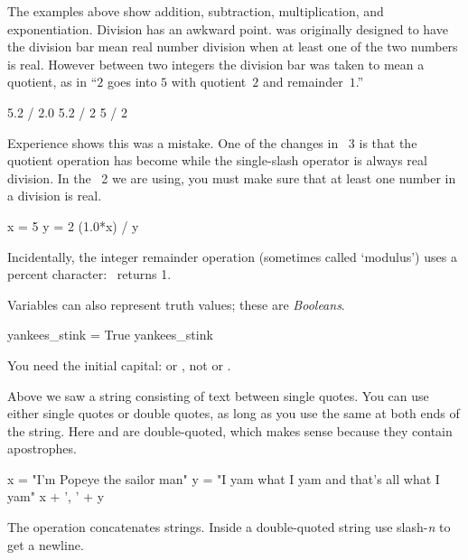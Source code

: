 The examples above show addition, subtraction, multiplication, 
and exponentiation. 
Division has an awkward point.
\python{} was originally designed to have the division bar
\inlinecode{/} mean real number division 
when at least one of the two numbers is real.
However between two integers the division bar was taken to mean 
a quotient, as in ``$2$ goes into $5$ with quotient~$2$ and remainder~$1$.''
\begin{pythonoutput}
5.2 / 2.0
5.2 / 2
5 / 2
\end{pythonoutput}
Experience shows this was a mistake. 
One of the changes in \python~3
is that the quotient operation has become \inlinecode{//}
while the single-slash operator is always real division.
In the \python~2 we are using, you must make sure that at least one
number in a division is real.
\begin{pythonoutput}
x = 5
y = 2
(1.0*x) / y
\end{pythonoutput}
\noindent Incidentally, 
the integer remainder operation (sometimes called `modulus')  
uses a percent character:~ returns 1.

Variables can also represent truth values; these are \textit{Booleans}.
\begin{pythonoutput}
yankees_stink = True
yankees_stink
\end{pythonoutput}
\noindent You need the initial capital:
or , not
or .
 
Above we saw a string consisting of text between single quotes.
You can use either single quotes or double quotes, as long as you use
the same at both ends of the string. 
Here  and 
are double-quoted, which makes sense because they contain apostrophes. 
\begin{pythonoutput}
x = "I'm Popeye the sailor man"
y = "I yam what I yam and that's all what I yam"
x + ', ' + y
\end{pythonoutput}
\noindent The \inlinecode{+} operation concatenates strings.
Inside a double-quoted string use slash-\textit{n} \inlinecode{\\n} to
get a newline.

